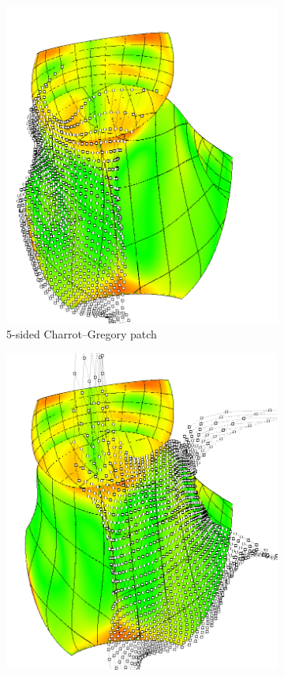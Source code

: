 \documentclass[9pt,academicons]{article}
\begin{document}
\begin{figure}
{\begin{subfigure}{.3\textwidth}
      \includegraphics[width=\textwidth]{images/cagd86/cg2.png}
      \caption{5-sided Charrot--Gregory patch}
      \label{fig:cagd86-5-cg}
    \end{subfigure}
    \hfill
    \begin{subfigure}{.3\textwidth}
      \centering
      \includegraphics[width=\textwidth]{images/cagd86/cg1.png}

\end{subfigure}}
\end{figure}
\end{document}
